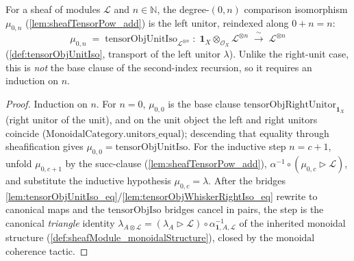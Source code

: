 \begin{lemma}\leanok
  \label{lem:tensorPowAdd_zero_left}
  For a sheaf of modules \(\mathcal{L}\) and \(n \in \mathbb{N}\), the degree-\((0,n)\)
  comparison isomorphism \(\mu_{0,n}\) (\cref{lem:sheafTensorPow_add}) is the left
  unitor, reindexed along \(0 + n = n\):
  \[
    \mu_{0,n} \;=\;
      \mathrm{tensorObjUnitIso}_{\mathcal{L}^{\otimes n}}
      \;:\; \mathbf{1}_X \otimes_{\mathcal{O}_X} \mathcal{L}^{\otimes n}
      \;\xrightarrow{\ \sim\ }\; \mathcal{L}^{\otimes n}
  \]
  (\cref{def:tensorObjUnitIso}, transport of the left unitor \(\lambda\)). Unlike
  the right-unit case, this is \emph{not} the base clause of the second-index
  recursion, so it requires an induction on \(n\).
\end{lemma}

\begin{proof}
  \leanok
  Induction on \(n\). For \(n = 0\), \(\mu_{0,0}\) is the base clause
  \(\mathrm{tensorObjRightUnitor}_{\mathbf{1}_X}\) (right unitor of the unit), and on
  the unit object the left and right unitors coincide
  (\(\mathrm{MonoidalCategory.unitors\_equal}\)); descending that equality through
  sheafification gives \(\mu_{0,0} = \mathrm{tensorObjUnitIso}\). For the inductive
  step \(n = c+1\), unfold \(\mu_{0,c+1}\) by the succ-clause
  (\cref{lem:sheafTensorPow_add}), \(\alpha^{-1} \circ (\mu_{0,c} \rhd \mathcal{L})\),
  and substitute the inductive hypothesis \(\mu_{0,c} = \lambda\). After the bridges
  \cref{lem:tensorObjUnitIso_eq}/\cref{lem:tensorObjWhiskerRightIso_eq} rewrite to
  canonical maps and the \(\mathrm{tensorObjIso}\) bridges cancel in pairs, the step
  is the canonical \emph{triangle} identity \(\lambda_{A \otimes \mathcal{L}} =
  (\lambda_A \rhd \mathcal{L}) \circ \alpha^{-1}_{\mathbf{1}, A, \mathcal{L}}\) of the
  inherited monoidal structure (\cref{def:sheafModule_monoidalStructure}), closed by
  the \(\mathrm{monoidal}\) coherence tactic.
\end{proof}

